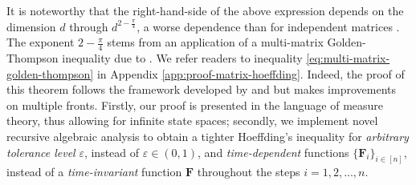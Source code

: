 It is noteworthy that the right-hand-side of the above expression depends on the dimension $d$ through $d^{2-\frac{\pi}{4}}$, a worse dependence than  for independent matrices \citep[see, e.g.,][Theorem 5.2]{Tropp2011matrixtails}. The exponent $2-\frac{\pi}{4}$ stems from an application of a multi-matrix Golden-Thompson inequality due to \cite{garg2018matrixexpanderchernoff}.
We refer readers to inequality \eqref{eq:multi-matrix-golden-thompson} in Appendix \ref{app:proof-matrix-hoeffding}. Indeed, the proof of this theorem follows the framework developed by \cite{garg2018matrixexpanderchernoff} and \cite{qiu2020matrix} but makes improvements on multiple fronts. Firstly, our proof is presented in the language of measure theory, thus allowing for infinite state spaces; secondly, we implement novel recursive algebraic analysis to obtain a tighter Hoeffding's inequality for \emph{arbitrary tolerance level} $\varepsilon$, instead of $\varepsilon \in (0,1)$,  and \emph{time-dependent} functions $\{\bm{F}_i\}_{i \in [n]}$, instead of a \emph{time-invariant} function $\bm{F}$ throughout the steps $i = 1,2,...,n$. 

